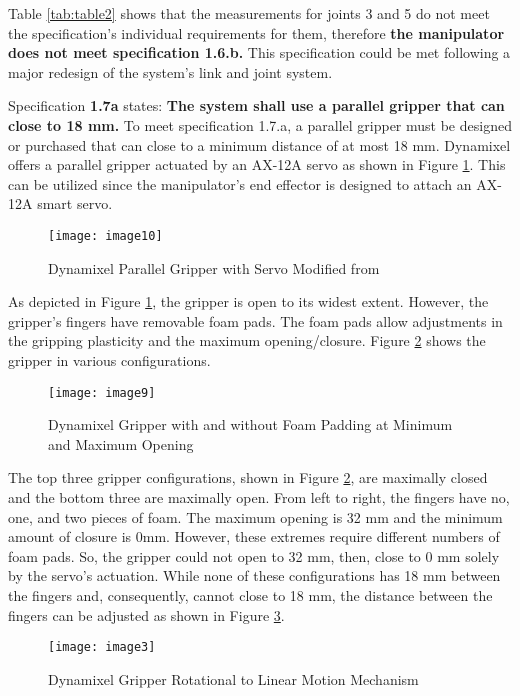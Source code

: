 Table \ref{tab:table2} shows that the measurements for joints 3 and 5 do not meet the specification’s individual requirements for them, therefore \textbf{the manipulator does not meet specification 1.6.b.} This specification could be met following a major redesign of the system’s link and joint system.


Specification \textbf{1.7a} states: \textbf{The system shall use a parallel gripper that can close to 18 mm.} To meet specification 1.7.a, a parallel gripper must be designed or purchased that can close to a minimum distance of at most 18 mm. Dynamixel offers a parallel gripper actuated by an AX-12A servo as shown in Figure \ref{fig:gripper1}. This can be utilized since the manipulator’s end effector is designed to attach an AX-12A smart servo.

\begin{figure}[htp]
  \centering
  \texttt{[image: image10]}
  \caption{Dynamixel Parallel Gripper with Servo Modified from \cite{gripper1}}
  \label{fig:gripper1}
\end{figure}

As depicted in Figure \ref{fig:gripper1}, the gripper is open to its widest extent. However, the gripper’s fingers have removable foam pads. The foam pads allow adjustments in the gripping plasticity and the maximum opening/closure. Figure \ref{fig:gripper2} shows the gripper in various configurations.

\begin{figure}[ht]
  \centering
  \texttt{[image: image9]}
  \caption{Dynamixel Gripper with and without Foam Padding at Minimum and Maximum Opening \cite{gripper1}}
  \label{fig:gripper2}
\end{figure}

The top three gripper configurations, shown in Figure \ref{fig:gripper2}, are maximally closed and the bottom three are maximally open.  From left to right, the fingers have no, one, and two pieces of foam. The maximum opening is 32 mm and the minimum amount of closure is 0mm. However, these extremes require different numbers of foam pads. So, the gripper could not open to 32 mm, then, close to 0 mm solely by the servo’s actuation. While none of these configurations has 18 mm between the fingers and, consequently, cannot close to 18 mm, the distance between the fingers can be adjusted as shown in Figure \ref{fig:gripper3}.

\begin{figure}[htp]
  \centering
  \texttt{[image: image3]}
  \caption{Dynamixel Gripper Rotational to Linear Motion Mechanism \cite{gripper2}}
  \label{fig:gripper3}
\end{figure}

